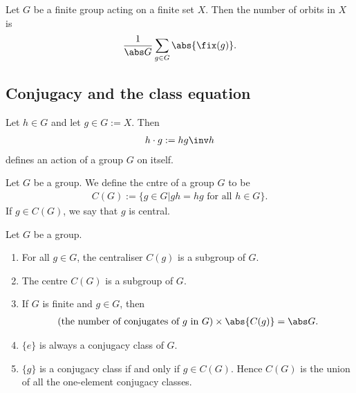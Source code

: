 \documentclass{article}
\begin{document}
\begin{theorem}
	Let $G$ be a finite group acting on a finite set $X$. Then
	the number of orbits in $X$ is
	\begin{align*}
		\frac{1}{\abs G} \sum_{g\in G} \abs{\fix(g)}.
	\end{align*}
\end{theorem}

\subsection{Conjugacy and the class equation}

\begin{lemma}
	Let $h\in G$ and let $g\in G := X$. Then
	\begin{align*}
		h\cdot g := hg\inv h
	\end{align*}
	defines an action of a group $G$ on itself.
\end{lemma}

\setcounter{theorem}{3}
\begin{definition}
	Let $G$ be a group. We define the cntre of a group $G$ to be
	\begin{align*}
		C(G) := \{g\in G | gh = hg \text{ for all } h\in G\}.
	\end{align*}
	If $g\in C(G)$, we say that $g$ is central.
\end{definition}

\setcounter{theorem}{5}
\begin{corollary}
	Let $G$ be a group.
	\begin{enumerate}
		\item For all $g\in G$, the centraliser $C(g)$ is a subgroup of $G$.
		\item The centre $C(G)$ is a subgroup of $G$.
		\item If $G$ is finite and $g\in G$, then \begin{align*}
			      (\text{the number of conjugates of $g$ in $G$})\times
			      \abs{C(g)} = \abs G.
		      \end{align*}
		\item $\{e\}$ is always a conjugacy class of $G$.
		\item $\{g\}$ is a conjugacy class if and only if $g\in C(G)$. Hence
		      $C(G)$ is the union of all the one-element conjugacy classes.
	\end{enumerate}
\end{corollary}
\end{document}
